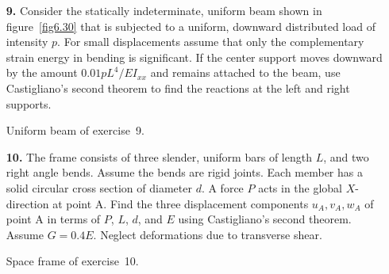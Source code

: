 \documentclass{AeroStructure-ERJohnson}
\begin{document}
\begin{exercise}
\begin{enumerate}[\textbf{2.}]
\item[\textbf{9.}] Consider the statically indeterminate, uniform beam shown in figure~\ref{fig6.30} that is subjected to a uniform, downward distributed load of intensity $p$. For small displacements assume that only the complementary strain energy in bending is significant. If the center support moves downward by the amount $0.01 p L^{4}/E I_{x x}$ and remains attached to the beam, use Castigliano's second theorem to find the reactions at the left and right supports.

{\floataboveskip=-1pc
\floatbelowskip=-0.6pc
{\caption{Uniform beam of exercise~9.\label{fig6.30}}}}

\item[\textbf{10.}] The frame consists of three slender, uniform bars of length $L$, and two right angle bends. Assume the bends are rigid joints. Each member has a solid circular cross section of diameter $d$. A force $P$ acts in the global $X$-direction at point A. Find the three displacement components $u_{A}, v_{A}, w_{A}$ of point A in terms of $P$, $L$, $d$, and $E$ using Castigliano's second theorem. Assume $G=0.4 E$. Neglect deformations due to transverse shear.

{\floataboveskip=-1pc
\floatbelowskip=-0.6pc
{\caption{Space frame of exercise~10.\label{fig6.31}}}}


\end{enumerate}
\end{exercise}
\end{document}
